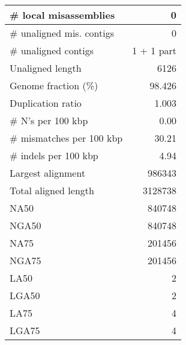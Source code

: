 \documentclass[12pt,a4paper]{article}
\begin{document}
\begin{table}[ht]
\begin{center}
\begin{tabular}{|l*{1}{|r}|}
\# local misassemblies & 0 \\ \hline
\# unaligned mis. contigs & 0 \\ \hline
\# unaligned contigs & 1 + 1 part \\ \hline
Unaligned length & 6126 \\ \hline
Genome fraction (\%) & 98.426 \\ \hline
Duplication ratio & 1.003 \\ \hline
\# N's per 100 kbp & 0.00 \\ \hline
\# mismatches per 100 kbp & 30.21 \\ \hline
\# indels per 100 kbp & 4.94 \\ \hline
Largest alignment & 986343 \\ \hline
Total aligned length & 3128738 \\ \hline
NA50 & 840748 \\ \hline
NGA50 & 840748 \\ \hline
NA75 & 201456 \\ \hline
NGA75 & 201456 \\ \hline
LA50 & 2 \\ \hline
LGA50 & 2 \\ \hline
LA75 & 4 \\ \hline
LGA75 & 4 \\ \hline
\end{tabular}
\end{center}
\end{table}
\end{document}

